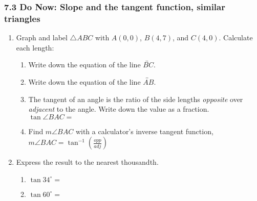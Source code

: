 \documentclass[12pt, twoside]{article}
\begin{document}
\subsubsection*{7.3 Do Now: Slope and the tangent function, similar triangles}
\begin{enumerate}
\item Graph and label $\triangle ABC$ with $A(0,0)$, $B(4,7)$, and $C(4,0)$. Calculate each length:
  \begin{enumerate}[itemsep=1.5cm]
    \item Write down the equation of the line $\overleftrightarrow{BC}$.
    \item Write down the equation of the line $\overleftrightarrow{AB}$. 
    \item The tangent of an angle is the ratio of the side lengths \emph{opposite} over \emph{adjacent} to the angle. Write down the value as a fraction. \\[0.5cm]
      $\tan \angle BAC=$
    \item Find $m\angle BAC$ with a calculator's inverse tangent function, $\displaystyle m \angle BAC = \tan^{-1}(\frac{opp}{adj})$
    \vspace{2cm}
  \end{enumerate}

\newpage
  \item Express the result to the nearest thousandth.  \vspace{.5cm}
    \begin{multicols}{2}
      \begin{enumerate}
        \item $\tan 34^\circ = $ \vspace{1cm}
        \item $\tan 60^\circ =$
      \end{enumerate}
    \end{multicols} \vspace{1cm}


\end{enumerate}
\end{document}

